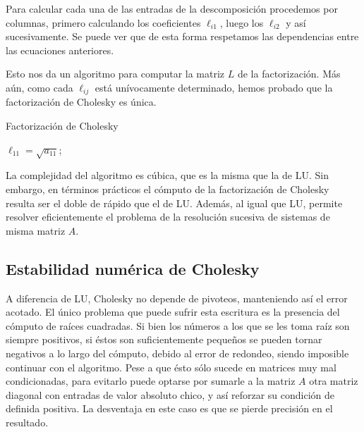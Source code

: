 Para calcular cada una de las entradas de la descomposición procedemos por columnas, primero calculando los coeficientes $\ell_{i1}$, luego los $\ell_{i2}$ y así sucesivamente. Se puede ver que de esta forma respetamos las dependencias entre las ecuaciones anteriores.

Esto nos da un algoritmo para computar la matriz $L$ de la factorización. Más aún, como cada $\ell_{ij}$ está unívocamente determinado, hemos probado que la factorización de Cholesky es única.

\begin{algorithm}
\caption[]{Factorización de Cholesky}
$\ell_{11} = \sqrt{a_{11}}$;\\
\end{algorithm}

La complejidad del algoritmo es cúbica, que es la misma que la de LU. Sin embargo, en términos prácticos el cómputo de la factorización de Cholesky resulta ser el doble de rápido que el de LU. Además, al igual que LU, permite resolver eficientemente el problema de la resolución sucesiva de sistemas de misma matriz $A$.

\subsection{Estabilidad numérica de Cholesky}
A diferencia de LU, Cholesky no depende de pivoteos, manteniendo así el error acotado. El único problema que puede sufrir esta escritura es la presencia del cómputo de raíces cuadradas. Si bien los números a los que se les toma raíz son siempre positivos, si éstos son suficientemente pequeños se pueden tornar negativos a lo largo del cómputo, debido al error de redondeo, siendo imposible continuar con el algoritmo. Pese a que ésto sólo sucede en matrices muy mal condicionadas, para evitarlo puede optarse por sumarle a la matriz $A$ otra matriz diagonal con entradas de valor absoluto chico, y así reforzar su condición de definida positiva. La desventaja en este caso es que se pierde precisión en el resultado.
